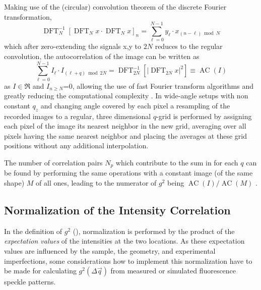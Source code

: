 Making use of the (circular) convolution theorem of the discrete Fourier transformation,
\begin{equation}
\operatorname{DFT}_N^{-1}\left[\operatorname{DFT}_N x \cdot \operatorname{DFT}_N x\right]_n=\sum_{\ell=0}^{N-1} y_{\ell} \cdot x_{(n-\ell) \bmod N}
\end{equation}
which after zero-extending the signals x,y to $2N$ reduces to the regular convolution, the autocorrelation of the image can be written as 
\begin{equation}
\sum_{\ell=0}^{N-1} I_{\ell} \cdot I_{(\ell+q) \bmod 2N}=\operatorname{DFT}_{2N}^{-1}\left[\left|\operatorname{DFT}_{2N} {x}\right|^2\right]\equiv \operatorname{AC}(I)
\label{eq:fftcorrelation}
\end{equation} 
as $I\in \Re$ and $I_{n\geq N}$=0, allowing the use of fast Fourier transform algorithms and greatly reducing the computational complexity \cite{oppenheim2009}.  In wide-angle setups with non constant $q_z$ and changing angle covered by each pixel a resampling of the recorded images to a regular, three dimensional $q$-grid is performed by assigning each pixel of the image its nearest neighbor in the new grid, averaging over all pixels having the same nearest neighbor and placing the averages at these grid positions without any additional interpolation. 

The number of correlation pairs $N_p$ which contribute to the sum in  for each $q$ can be found by performing the same operations with a constant image (of the same shape) $M$ of all ones, leading to the numerator of $g^2$ being $\operatorname{AC}(I)/\operatorname{AC}(M)$ \cite{oppenheim2009,butz2015,nion2008}.

\subsection{Normalization of the Intensity Correlation}
\label{sec:normal}
In the definition of $g^2$ (), normalization is performed by the product of the \textit{expectation values} of the intensities at the two locations. As these expectation values are influenced by the sample, the geometry, and experimental imperfections, some considerations how to implement this normalization have to be made for calculating $g^2(\Delta\vec{q})$ from measured or simulated fluorescence speckle patterns. 

